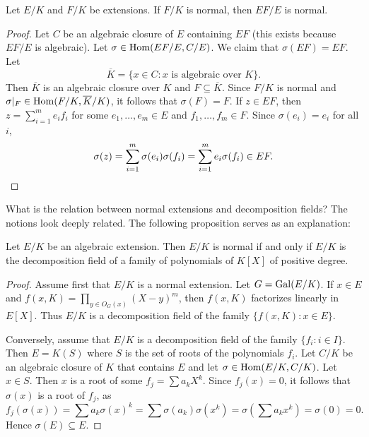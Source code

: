 \begin{proposition}
    Let $E/K$ and $F/K$ be extensions. If $F/K$ 
    is normal, then $EF/E$ is normal.
\end{proposition}

\begin{proof}
    Let $C$ be an algebraic closure of $E$ containing $EF$ (this exists because $EF/E$ is algebraic). 
    Let $\sigma\in\operatorname{Hom}(EF/E,C/E)$. We claim that $\sigma(EF)=EF$. Let 
    \[
    \overline{K}=\{x\in C:x\text{ is algebraic over $K$}\}.
    \]
    Then $\overline{K}$ is an algebraic closure over $K$ and $F\subseteq\overline{K}$. 
    Since $F/K$ is normal and $\sigma|_F\in\operatorname{Hom}(F/K,\overline{K}/K)$, 
    it follows that $\sigma(F)=F$. If $z\in EF$, then
    $z=\sum_{i=1}^m e_if_i$ for some $e_1,\dots,e_m\in E$ and 
    $f_1,\dots,f_m\in F$. Since $\sigma(e_i)=e_i$ for all $i$,  
    \[
    \sigma(z)=\sum_{i=1}^m\sigma(e_i)\sigma(f_i)=\sum_{i=1}^m e_i\sigma(f_i)\in EF.\qedhere 
    \]
\end{proof}

What is the relation between 
normal extensions and decomposition fields? The notions look
deeply related. The following proposition serves as an explanation: 

\begin{proposition}
    Let $E/K$ be an algebraic extension. Then 
    $E/K$ is normal if and only if $E/K$ is the decomposition field
    of a family of polynomials of $K[X]$ of positive degree.
\end{proposition}

\begin{proof}
    Assume first that $E/K$ is a normal extension. 
    Let $G=\operatorname{Gal}(E/K)$.  If $x\in E$ and $f(x,K)=\prod_{y\in O_G(x)}(X-y)^m$, 
    then $f(x,K)$ factorizes linearly in $E[X]$. Thus 
    $E/K$ is a decomposition field of the family 
    $\{f(x,K):x\in E\}$. 
    
    Conversely, assume that $E/K$ is a decomposition field of the family 
    $\{f_i:i\in I\}$. Then $E=K(S)$ where $S$ is the set of roots
    of the polynomials $f_i$. Let $C/K$ be an algebraic closure
    of $K$ that contains $E$ and let $\sigma\in\operatorname{Hom}(E/K,C/K)$. Let $x\in S$. 
    Then $x$ is a root of some $f_j=\sum a_kX^k$. Since $f_j(x)=0$, 
    it follows that $\sigma(x)$ is a root of $f_j$, as 
    \[
    f_j(\sigma(x))=\sum a_k\sigma(x)^k
    =\sum\sigma(a_k)\sigma(x^k)
    =\sigma\left(\sum a_kx^k\right)=\sigma(0)=0.
    \]
    Hence $\sigma(E)\subseteq E$. 
\end{proof}

